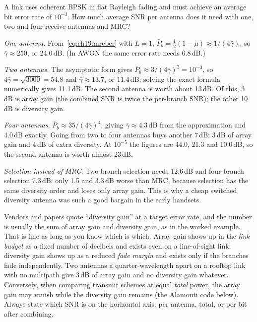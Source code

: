 \begin{worked}
A link uses coherent BPSK in flat Rayleigh fading and must achieve an average bit error rate of
$10^{-3}$. How much average SNR per antenna does it need with one, two and four receive antennas
and MRC?

\emph{One antenna.} From~\eqref{eq:ch19:mrcber} with $L=1$,
$\bar P_b=\tfrac12(1-\mu)\approx1/(4\bar\gamma)$, so $\bar\gamma\approx250$, or 24.0\,dB. (In AWGN
the same error rate needs 6.8\,dB.)

\emph{Two antennas.} The asymptotic form gives $\bar P_b\approx3/(4\bar\gamma)^2=10^{-3}$, so
$4\bar\gamma=\sqrt{3000}=54.8$ and $\bar\gamma\approx13.7$, or 11.4\,dB; solving the exact formula
numerically gives 11.1\,dB. The second antenna is worth about 13\,dB. Of this, 3\,dB is array gain
(the combined SNR is twice the per-branch SNR); the other 10\,dB is diversity gain.

\emph{Four antennas.} $\bar P_b\approx35/(4\bar\gamma)^4$, giving $\bar\gamma\approx4.3$\,dB from the
approximation and 4.0\,dB exactly. Going from two to four antennas buys another 7\,dB: 3\,dB of array
gain and 4\,dB of extra diversity. At $10^{-5}$ the figures are 44.0, 21.3 and 10.0\,dB, so the
second antenna is worth almost 23\,dB.

\emph{Selection instead of MRC.} Two-branch selection needs 12.6\,dB and four-branch selection
7.3\,dB: only 1.5 and 3.3\,dB worse than MRC, because selection has the same diversity order and
loses only array gain. This is why a cheap switched diversity antenna was such a good bargain in
the early handsets.
\end{worked}


\begin{pitfall}
Vendors and papers quote ``diversity gain'' at a target error rate, and the number is usually the
sum of array gain and diversity gain, as in the worked example. That is fine as long as you know
which is which. Array gain shows up in the \emph{link budget} as a fixed number of decibels and
exists even on a line-of-sight link; diversity gain shows up as a reduced \emph{fade margin} and
exists only if the branches fade independently. Two antennas a quarter-wavelength apart on a
rooftop link with no multipath give 3\,dB of array gain and no diversity gain whatever. Conversely,
when comparing transmit schemes at equal \emph{total} power, the array gain may vanish while the
diversity gain remains (the Alamouti code below). Always state which SNR is on the horizontal
axis: per antenna, total, or per bit after combining.
\end{pitfall}

